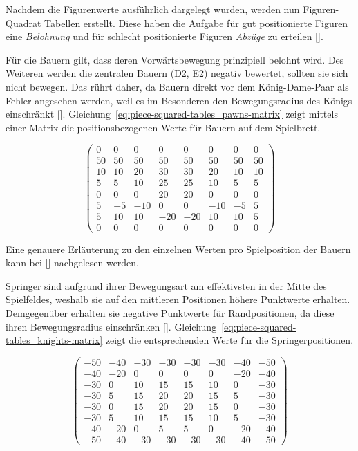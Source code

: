 Nachdem die Figurenwerte ausführlich dargelegt wurden, werden nun Figuren-Quadrat Tabellen erstellt.
Diese haben die Aufgabe für gut positionierte Figuren eine \textit{Belohnung} und für schlecht positionierte Figuren \textit{Abzüge} zu erteilen [\cite{Wiki2018}].

Für die Bauern gilt, dass deren Vorwärtsbewegung prinzipiell belohnt wird.
Des Weiteren werden die zentralen Bauern (D2, E2) negativ bewertet, sollten sie sich nicht bewegen.
Das rührt daher, da Bauern direkt vor dem König-Dame-Paar als Fehler angesehen werden, weil es im Besonderen den Bewegungsradius des Königs einschränkt [\cite{Wiki2018}].
Gleichung~\ref{eq:piece-squared-tables_pawns-matrix} zeigt mittels einer Matrix die positionsbezogenen Werte für Bauern auf dem Spielbrett.

\begin{equation} \label{eq:piece-squared-tables_pawns-matrix}
\begin{pmatrix}
0 & 0 & 0 & 0 & 0 & 0 & 0 & 0 \\
50 & 50 & 50 & 50 & 50 & 50 & 50 & 50 \\
10 & 10 & 20 & 30 & 30 & 20 & 10 & 10 \\
5 & 5 & 10 & 25 & 25 & 10 & 5 & 5 \\
0 & 0 & 0 & 20 & 20 & 0 & 0 & 0 \\
5 & -5 & -10 & 0 & 0 & -10 & -5 & 5 \\
5 & 10 & 10 & -20 & -20 & 10 & 10 & 5 \\
0 & 0 & 0 & 0 & 0 & 0 & 0 & 0
\end{pmatrix}
\end{equation}

\bigskip

\noindent Eine genauere Erläuterung zu den einzelnen Werten pro Spielposition der Bauern kann bei [\cite{Wiki2018}] nachgelesen werden.

Springer sind aufgrund ihrer Bewegungsart am effektivsten in der Mitte des Spielfeldes, weshalb sie auf den mittleren Positionen höhere Punktwerte erhalten.
Demgegenüber erhalten sie negative Punktwerte für Randpositionen, da diese ihren Bewegungsradius einschränken [\cite{Wiki2018}].
Gleichung~\ref{eq:piece-squared-tables_knights-matrix} zeigt die entsprechenden Werte für die Springerpositionen.

\begin{equation} \label{eq:piece-squared-tables_knights-matrix}
\begin{pmatrix}
-50 & -40 & -30 & -30 & -30 & -30 & -40 & -50 \\
-40 & -20 & 0 & 0 & 0 & 0 & -20 & -40 \\
-30 & 0 & 10 & 15 & 15 & 10 & 0 & -30 \\
-30 & 5 & 15 & 20 & 20 & 15 & 5 & -30 \\
-30 & 0 & 15 & 20 & 20 & 15 & 0 & -30 \\
-30 & 5 & 10 & 15 & 15 & 10 & 5 & -30 \\
-40 & -20 & 0 & 5 & 5 & 0 & -20 & -40 \\
-50 & -40 & -30 & -30 & -30 & -30 & -40 & -50
\end{pmatrix}
\end{equation}

